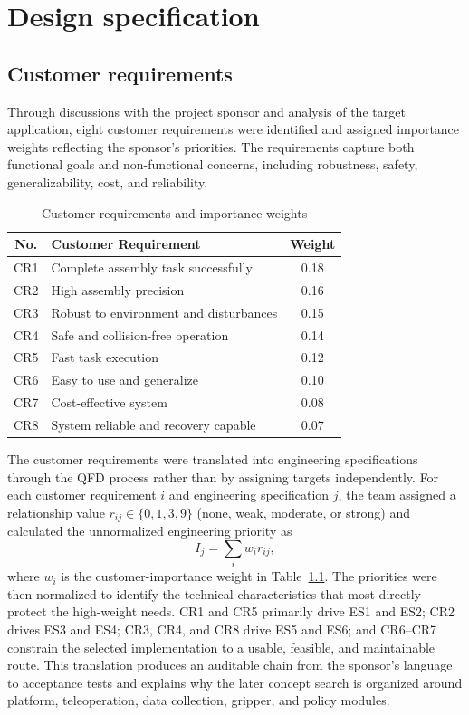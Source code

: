 
\chapter{Design specification}\label{chap:design-spec}

\section{Customer requirements}

Through discussions with the project sponsor and analysis of the target application, eight customer requirements were identified and assigned importance weights reflecting the sponsor's priorities. The requirements capture both functional goals and non-functional concerns, including robustness, safety, generalizability, cost, and reliability.

\begin{table}[!htbp]
\centering
\caption{Customer requirements and importance weights}
\label{tab:cr}
\begin{tabular}{clc}
\toprule
\textbf{No.} & \textbf{Customer Requirement} & \textbf{Weight} \\
\midrule
CR1 & Complete assembly task successfully & 0.18 \\
CR2 & High assembly precision & 0.16 \\
CR3 & Robust to environment and disturbances & 0.15 \\
CR4 & Safe and collision-free operation & 0.14 \\
CR5 & Fast task execution & 0.12 \\
CR6 & Easy to use and generalize & 0.10 \\
CR7 & Cost-effective system & 0.08 \\
CR8 & System reliable and recovery capable & 0.07 \\
\bottomrule
\end{tabular}
\end{table}

The customer requirements were translated into engineering specifications through the QFD process rather than by assigning targets independently. For each customer requirement $i$ and engineering specification $j$, the team assigned a relationship value $r_{ij}\in\{0,1,3,9\}$ (none, weak, moderate, or strong) and calculated the unnormalized engineering priority as
\begin{equation}
I_j=\sum_i w_i r_{ij},
\end{equation}
where $w_i$ is the customer-importance weight in Table~\ref{tab:cr}. The priorities were then normalized to identify the technical characteristics that most directly protect the high-weight needs. CR1 and CR5 primarily drive ES1 and ES2; CR2 drives ES3 and ES4; CR3, CR4, and CR8 drive ES5 and ES6; and CR6--CR7 constrain the selected implementation to a usable, feasible, and maintainable route. This translation produces an auditable chain from the sponsor's language to acceptance tests and explains why the later concept search is organized around platform, teleoperation, data collection, gripper, and policy modules.

